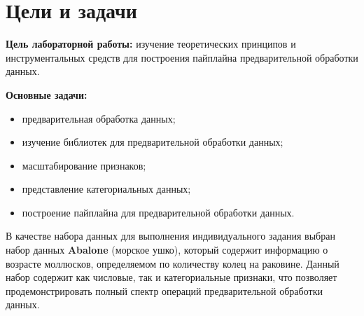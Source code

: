 \chapter*{Цели и задачи}
\label{ch:intro_lab5}

\textbf{Цель лабораторной работы:} изучение теоретических принципов и инструментальных средств для построения пайплайна предварительной обработки данных.

\textbf{Основные задачи:}
\begin{itemize}
    \item предварительная обработка данных;
    \item изучение библиотек для предварительной обработки данных;
    \item масштабирование признаков;
    \item представление категориальных данных;
    \item построение пайплайна для предварительной обработки данных.
\end{itemize}

В качестве набора данных для выполнения индивидуального задания выбран набор данных \textbf{Abalone} (морское ушко), который содержит информацию о возрасте моллюсков, определяемом по количеству колец на раковине. Данный набор содержит как числовые, так и категориальные признаки, что позволяет продемонстрировать полный спектр операций предварительной обработки данных.

\endinput